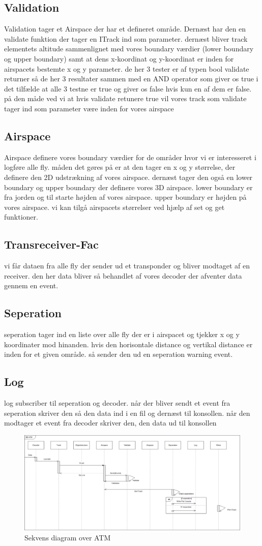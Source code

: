 \subsection{Validation}
Validation tager et Airspace der har et defineret område. Dernæst har den en validate funktion der tager en ITrack ind som parameter. dernæst bliver track elementets altitude sammenlignet med vores boundary værdier (lower boundary og upper boundary) samt at dens x-koordinat og y-koordinat er inden for airspacets bestemte x og y parameter. de her 3 tester er af typen bool validate returner så de her 3 resultater sammen med en AND operator som giver os true i det tilfælde at alle 3 testne er true og giver os false hvis kun en af dem er false. på den måde ved vi at hvis validate retunere true vil vores track som validate tager ind som parameter være inden for vores airspace
\subsection{Airspace}
Airspace definere vores boundary værdier for de områder hvor vi er interesseret i logføre alle fly. måden det gøres på er at den tager en x og y størrelse, der definere den 2D udstrækning af vores airspace. dernæst tager den også en lower boundary og upper boundary der definere vores 3D airspace. lower boundary er fra jorden og til starte højden af vores airspace. upper boundary er højden på vores airspace. vi kan tilgå airspacets størrelser ved hjælp af set og get funktioner.
\subsection{Transreceiver-Fac}
vi får dataen fra alle fly der sender ud et transponder og bliver modtaget af en receiver. den her data bliver så behandlet af vores decoder der afventer data gennem en event.
\subsection{Seperation}
seperation tager ind en liste over alle fly der er i airspacet og tjekker x og y koordinater mod hinanden. hvis den horisontale distance og vertikal distance er inden for et given område. så sender den ud en seperation warning event.
\subsection{Log}
log subscriber til seperation og decoder. når der bliver sendt et event fra seperation skriver den så den data ind i en fil og dernæst til konsollen. når den modtager et event fra decoder skriver den, den data ud til konsollen 


\begin{figure}[H]
	\centering
	\includegraphics[width=1\linewidth]{../Diagrammer/SD_ATM}
	\caption{Sekvens diagram over ATM}
	\label{fig:sdatm}
\end{figure}
